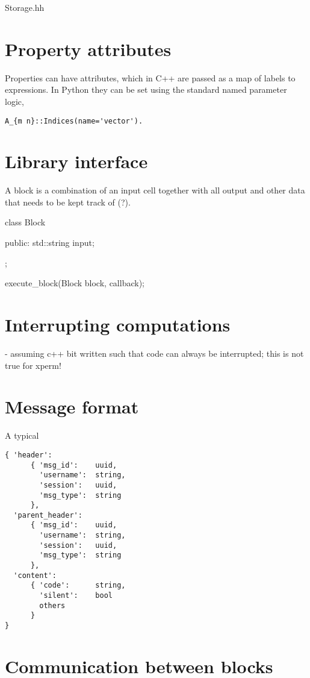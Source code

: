 

Storage.hh


\section{Property attributes}

Properties can have attributes, which in C++ are passed as a map of
labels to expressions. In Python they can be set using the standard
named parameter logic,
\begin{verbatim}
A_{m n}::Indices(name='vector').
\end{verbatim}


\section{Library interface}

A block is a combination of an input cell together with all output and
other data that needs to be kept track of (?). 

class Block {
   public: 
      std::string input;
      
};

execute_block(Block block, callback);

\section{Interrupting computations}

- assuming c++ bit written such that code can always be interrupted;
  this is not true for xperm! 


\section{Message format}

A typical
\begin{verbatim}
{ 'header':  
      { 'msg_id':    uuid,
        'username':  string,
        'session':   uuid,
        'msg_type':  string
      },
  'parent_header':
      { 'msg_id':    uuid,
        'username':  string,
        'session':   uuid,
        'msg_type':  string
      },
  'content': 
      { 'code':      string,
        'silent':    bool
        others
      }
}
\end{verbatim}

\section{Communication between blocks}

